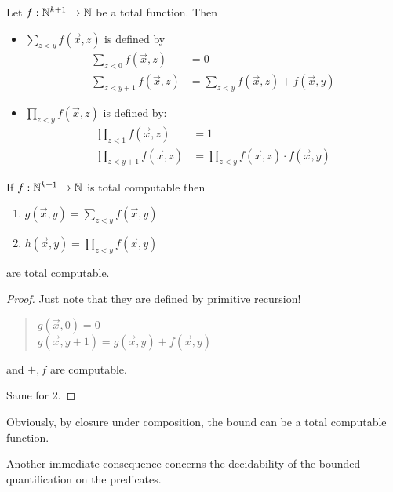 \begin{definition}
  Let $f:\mathbb{N}^{k+1}\rightarrow\mathbb{N}$ be a total function. Then
  
  \begin{itemize}
    
  \item 
    $\sum_{z<y}f(\vec{x},z)$ is defined by
    \begin{align*}
      \sum_{z<0}f(\vec{x},z) &= 0 \\
      \sum_{z<y+1}f(\vec{x},z) &= \sum_{z<y}f(\vec{x},z) + f(\vec{x},y)
    \end{align*}
    
    
  \item $\prod_{z<y}f(\vec{x},z)$ is defined by:
    \begin{align*}
      \prod_{z<1}f(\vec{x},z) &= 1 \\
      \prod_{z<y+1}f(\vec{x},z) &= \prod_{z<y}f(\vec{x},z) \cdot f(\vec{x},y)
    \end{align*}
  \end{itemize}
\end{definition}

\begin{lemma}
  If $f:\mathbb{N}^{k+1}\rightarrow\mathbb{N}$ is total computable then
  \begin{enumerate}
  \item $g(\vec{x},y) = \sum_{z<y}f(\vec{x},y)$
  \item $h(\vec{x},y) = \prod_{z<y}f(\vec{x},y)$
  \end{enumerate}
  are total computable.
\end{lemma}

\begin{proof}
  Just note that they are defined by primitive recursion!

  \begin{quote}
    $g(\vec{x},0) = 0$\\
    $g(\vec{x},y+1) = g(\vec{x},y) + f(\vec{x},y)$
  \end{quote}
  
  and $+,f$ are computable.

  Same for 2.
\end{proof}

Obviously, by closure under composition, the bound can be a total computable function.

Another immediate consequence concerns the decidability of the bounded quantification on the predicates.

